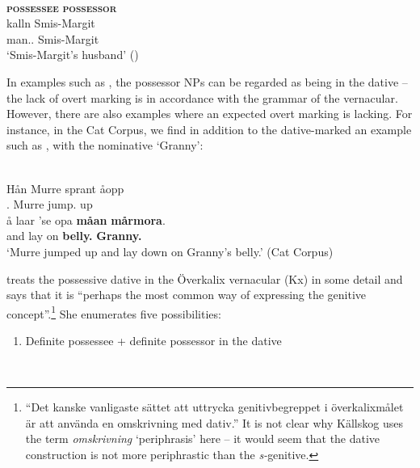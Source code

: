 \ea%
	\\
	\glll \textbf{\textsc{possessee}} \textbf{\textsc{possessor}} \\
	kalln  Smis-Margit \\
	man.{}.{\sg}  Smis-Margit\\
\glt ‘Smis-Margit’s husband’ (\citealt[97]{Levander1909})
\z

In examples such as , the possessor NPs can be regarded as being in the dative – the lack of overt marking is in accordance with the grammar of the vernacular. However, there are also examples where an expected overt marking is lacking. For instance, in the Cat Corpus, we find in addition to the dative-marked  an example such as , with the nominative  ‘Granny’: 

\renewcommand{\eachwordone}{\itshape} 
\renewcommand{\eachwordtwo}{\upshape}

\ea%
\\
\gll Hån  Murre  sprant  åopp\\
{\pda}.{\m}  Murre  jump.{\pst}  up\\
\gll å  laar  ’se  opa  \textbf{måan} \textbf{mårmora}.\\
and  lay  {}  on  \textbf{belly.{}} \textbf{Granny.{}}\\
\glt ‘Murre jumped up and lay down on Granny’s belly.’ (Cat Corpus)
\z

\citet[161--163]{Källskog1992} treats the possessive dative in the Överkalix vernacular (Kx) in some detail and says that it is “perhaps the most common way of expressing the genitive concept”.\footnote{ “Det kanske vanligaste sättet att uttrycka genitivbegreppet i överkalixmålet är att använda en omskrivning med dativ.” It is not clear why Källskog uses the term \textit{omskrivning} ‘periphrasis’ here – it would seem that the dative construction is not more periphrastic than the \textit{s-}genitive.} She enumerates five possibilities:

\begin{enumerate}
\item[1] Definite possessee + definite possessor in the dative
\end{enumerate}


\renewcommand{\eachwordone}{\scshape}
\renewcommand{\eachwordtwo}{\itshape}  
\ea%
\\

